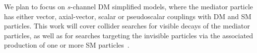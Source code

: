 \documentclass[a4paper,11pt,notoc]{article}
\begin{document}
We plan to focus on $s$-channel DM simplified models, where the mediator particle has either vector, axial-vector, scalar or pseudoscalar couplings with DM and SM particles. This work will cover collider searches for visible decays of the mediator particles, as well as for searches targeting the invisible particles via the associated production of one or more SM particles~\cite{ATL-PHYS-PUB-2020-021,CMSSummary}.



\end{document}
